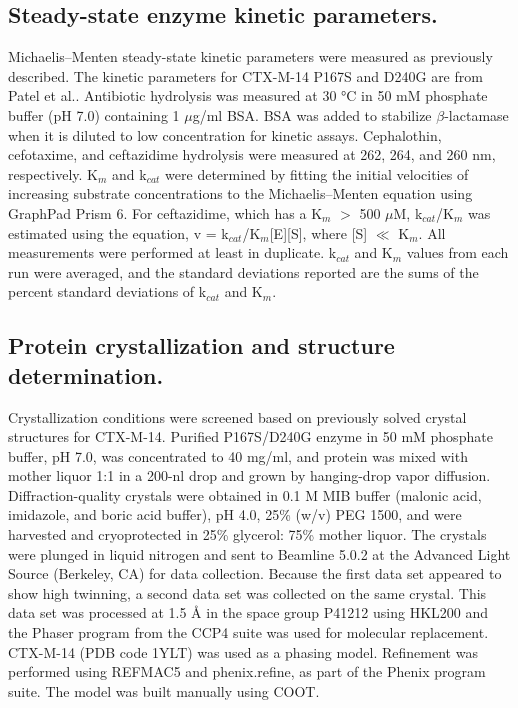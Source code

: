 \documentclass[../main.tex]{subfiles}
\begin{document}
    \subsection{Steady-state enzyme kinetic parameters.}
        Michaelis–Menten steady-state kinetic parameters were measured as previously described\cite{patel_characterization_2015,marciano_genetic_2008}. The kinetic parameters for CTX-M-14 P167S and D240G are from Patel et al.\cite{patel_characterization_2015}. Antibiotic hydrolysis was measured at 30 °C in 50 mM phosphate buffer (pH 7.0) containing 1 $\mu$g/ml BSA. BSA was added to stabilize $\beta$-lactamase when it is diluted to low concentration for kinetic assays. Cephalothin, cefotaxime, and ceftazidime hydrolysis were measured at 262, 264, and 260 nm, respectively\cite{patel_characterization_2015}. K$_{m}$ and k$_{cat}$ were determined by fitting the initial velocities of increasing substrate concentrations to the Michaelis–Menten equation using GraphPad Prism 6. For ceftazidime, which has a K$_{m}$ $>$ 500 $\mu$M, k$_{cat}$/K$_{m}$ was estimated using the equation, v = k$_{cat}$/K$_{m}$[E][S], where [S] $\ll$ K$_{m}$. All measurements were performed at least in duplicate. k$_{cat}$ and K$_{m}$ values from each run were averaged, and the standard deviations reported are the sums of the percent standard deviations of k$_{cat}$ and K$_{m}$\cite{patel_characterization_2015}.

    \subsection{Protein crystallization and structure determination.}
        Crystallization conditions were screened based on previously solved crystal structures for CTX-M-14. Purified P167S/D240G enzyme in 50 mM phosphate buffer, pH 7.0, was concentrated to 40 mg/ml, and protein was mixed with mother liquor 1:1 in a 200-nl drop and grown by hanging-drop vapor diffusion. Diffraction-quality crystals were obtained in 0.1 M MIB buffer (malonic acid, imidazole, and boric acid buffer), pH 4.0, 25\% (w/v) PEG 1500, and were harvested and cryoprotected in 25\% glycerol: 75\% mother liquor. The crystals were plunged in liquid nitrogen and sent to Beamline 5.0.2 at the Advanced Light Source (Berkeley, CA) for data collection. Because the first data set appeared to show high twinning, a second data set was collected on the same crystal. This data set was processed at 1.5 \AA{} in the space group P41212 using HKL200 and the Phaser program from the CCP4 suite was used for molecular replacement. CTX-M-14 (PDB code 1YLT) was used as a phasing model\cite{chen_atomic_2005}. Refinement was performed using REFMAC5 and phenix.refine, as part of the Phenix program suite\cite{adams_phenix_2010}. The model was built manually using COOT\cite{emsley_features_2010}.
\end{document}
